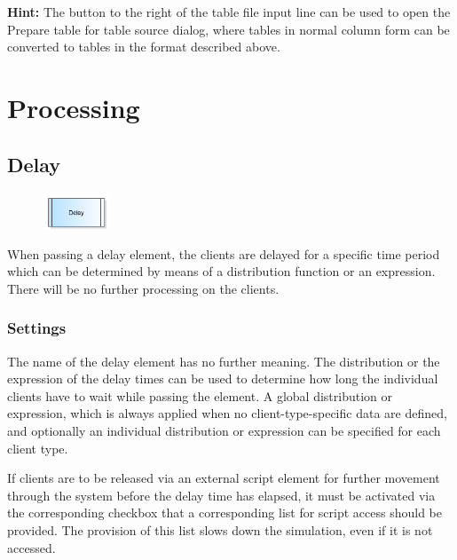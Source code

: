 \textbf{Hint:}
The button to the right of the table file input line can be used to open the 
Prepare table for table source dialog,
where tables in normal column form can be converted to tables in the format described above.





\chapter{Processing}

\section{Delay}
\label{ref:ModelElementDelay}

\begin{figure}
\vspace{-22pt}
\includegraphics[width=2cm]{imageModelElementDelay.png}
\vspace{-22pt}
\end{figure}

When passing a delay element, the clients are delayed for a specific time period which can be determined
 by means of a distribution function or an expression. There will be no further processing on the clients.

\subsection*{Settings}

The name of the delay element has no further meaning. The distribution or the expression of the delay times can be used
to determine how long the individual clients have to wait while passing the element. A global distribution or expression,
which is always applied when no client-type-specific data are defined, and optionally an individual distribution or expression
can be specified for each client type.

If clients are to be released via an external script element for further movement through the system before the delay time has elapsed,
it must be activated via the corresponding checkbox that a corresponding list for script access should be provided. The provision of
this list slows down the simulation, even if it is not accessed.


